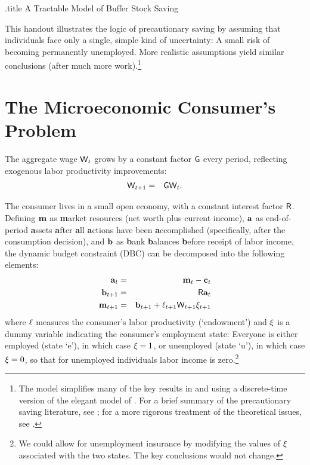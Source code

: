 \documentclass{handout}
\begin{document}
\handoutHeader
\providecommand{\dmEqZero}{\ensuremath{\Delta\mRatE=0}}
\providecommand{\dcEqZero}{\ensuremath{\Delta\cRatE=0}}

\begin{verbatimwrite}{\jobname.title}
A Tractable Model of Buffer Stock Saving
\end{verbatimwrite}

\handoutNameMake


This handout illustrates the logic of precautionary saving by assuming
that individuals face only a single, simple kind of uncertainty: A small risk of becoming permanently unemployed.  More realistic assumptions yield similar conclusions (after much more work).\footnote{The model simplifies many of the key results in \cite{carroll:brookings} and \cite{carroll:bslcpih} using a  discrete-time version of the elegant model of \cite{toche:urisk}.
  For a brief summary of the precautionary saving literature, see
  \cite{CarrollKimballPSPW}; for a more rigorous   treatment of the theoretical issues, see \cite{carrollBSTheory}.}

\section{The Microeconomic Consumer's Problem}
The aggregate wage $\mathsf{W}_{t}$ grows
by a constant factor $\mathsf{G}$ every period, reflecting exogenous labor productivity improvements:
\begin{eqnarray}
        \mathsf{W}_{t+1} & = & \mathsf{G} \mathsf{W}_{t}.
\end{eqnarray}

The consumer lives in a small open economy, with a constant interest factor $\mathsf{R}$.  Defining $\mathbf{m}$ as
{\bf m}arket resources (net worth plus current income), $\mathbf{a}$ as
end-of-period {\bf a}ssets {\bf a}fter {\bf a}ll {\bf a}ctions have been {\bf a}ccomplished
(specifically, after the consumption decision), and $\mathbf{b}$ as {\bf b}ank
{\bf b}alances {\bf b}efore receipt of labor income, the dynamic budget constraint (DBC) can be decomposed into the
following elements:
\begin{eqnarray}
    \mathbf{a}_{t} & = & \mathbf{m}_{t}-\mathbf{c}_{t}
\\  \mathbf{b}_{t+1} & = & \mathsf{R} \mathbf{a}_{t}
\\  \mathbf{m}_{t+1} & = & \mathbf{b}_{t+1}+\ell_{t+1}\mathsf{W}_{t+1}\xi_{t+1}  \label{eq:DBC}
\end{eqnarray}
where $\ell$ measures the consumer's labor productivity
(`endowment') and $\xi$ is a dummy variable indicating the
consumer's employment state: Everyone is either
employed (state `e'), in which case $\xi = 1$, or unemployed
(state `u'), in which case $\xi=0$, so that for unemployed
individuals labor income is zero.\footnote{We could allow for
  unemployment insurance by modifying the values of $\xi$
  associated with the two states.  The key conclusions would not
  change.}
\end{document}

